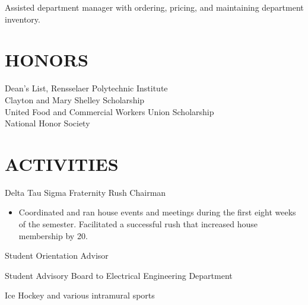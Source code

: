 \documentclass[margin,11pt]{res} %
\begin{document}
\begin{resume}
                Assisted department manager with ordering, 
                pricing, and maintaining department inventory. 
 
 
\section{HONORS}          Dean's List, Rensselaer Polytechnic Institute \\
                Clayton and Mary Shelley Scholarship \\
                United Food and Commercial Workers Union Scholarship \\
                National Honor Society 
 
 
\section{ACTIVITIES}      Delta Tau Sigma Fraternity Rush Chairman 
                    \begin{itemize} %
                    \item[] Coordinated and ran house events and meetings 
                    during the first eight weeks of the semester. 
                    Facilitated a successful rush that increased 
                    house membership by 20. 
                    \end{itemize}
                Student Orientation Advisor 
 
                Student Advisory Board to Electrical Engineering 
                Department 

                Ice Hockey and various intramural sports 

\end{resume} 
\end{document}
